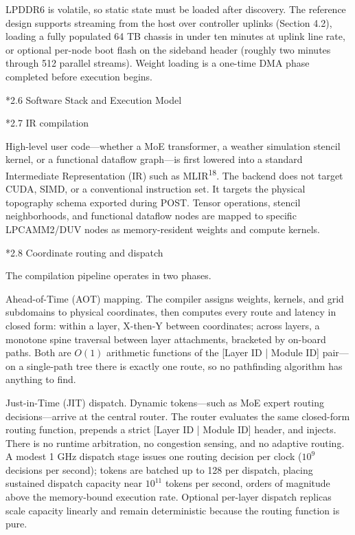 \documentclass[12pt]{article}
\makeatletter
\renewcommand\subsection{\@startsection{subsection}{2}{\z@}{-1.0ex \@plus -0.2ex}{0.3ex}{\normalsize\bfseries}}
\makeatother
\begin{document}
LPDDR6 is volatile, so static state must be loaded after discovery. The reference design supports streaming from the host over controller uplinks (Section 4.2), loading a fully populated 64 TB chassis in under ten minutes at uplink line rate, or optional per-node boot flash on the sideband header (roughly two minutes through 512 parallel streams). Weight loading is a one-time DMA phase completed before execution begins.

\subsection*{2.6 Software Stack and Execution Model}

\subsection*{2.7 IR compilation}

High-level user code---whether a MoE transformer, a weather simulation stencil kernel, or a functional dataflow graph---is first lowered into a standard Intermediate Representation (IR) such as MLIR\textsuperscript{18}. The backend does not target CUDA, SIMD, or a conventional instruction set. It targets the physical topography schema exported during POST. Tensor operations, stencil neighborhoods, and functional dataflow nodes are mapped to specific LPCAMM2/DUV nodes as memory-resident weights and compute kernels.

\subsection*{2.8 Coordinate routing and dispatch}

The compilation pipeline operates in two phases.

Ahead-of-Time (AOT) mapping. The compiler assigns weights, kernels, and grid subdomains to physical coordinates, then computes every route and latency in closed form: within a layer, X-then-Y between coordinates; across layers, a monotone spine traversal between layer attachments, bracketed by on-board paths. Both are $O(1)$ arithmetic functions of the [Layer ID | Module ID] pair---on a single-path tree there is exactly one route, so no pathfinding algorithm has anything to find.

Just-in-Time (JIT) dispatch. Dynamic tokens---such as MoE expert routing decisions---arrive at the central router. The router evaluates the same closed-form routing function, prepends a strict [Layer ID | Module ID] header, and injects. There is no runtime arbitration, no congestion sensing, and no adaptive routing. A modest 1 GHz dispatch stage issues one routing decision per clock ($10^9$ decisions per second); tokens are batched up to 128 per dispatch, placing sustained dispatch capacity near $10^{11}$ tokens per second, orders of magnitude above the memory-bound execution rate. Optional per-layer dispatch replicas scale capacity linearly and remain deterministic because the routing function is pure.
\end{document}
